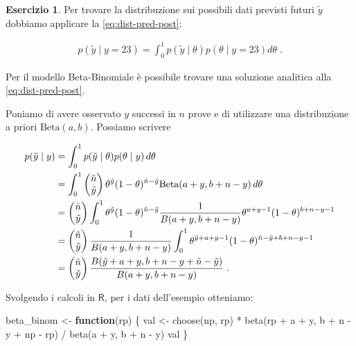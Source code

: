 \documentclass[
  11pt,
]{krantz}
\makeatletter
\newenvironment{Shaded}{\begin{snugshade}}{\end{snugshade}}
\newcommand{\ControlFlowTok}[1]{\textcolor[rgb]{0.27,0.27,0.27}{\textbf{#1}}}
\newcommand{\FunctionTok}[1]{\textcolor[rgb]{0,0,0}{#1}}
\newcommand{\NormalTok}[1]{#1}
\newcommand{\OtherTok}[1]{\textcolor[rgb]{0.37,0.37,0.37}{#1}}
\newcommand{\SpecialCharTok}[1]{\textcolor[rgb]{0,0,0}{#1}}
\newenvironment{kframe}{%
\medskip{}
\setlength{\fboxsep}{.8em}
 \def\at@end@of@kframe{}%
 \ifinner\ifhmode%
  \def\at@end@of@kframe{\end{minipage}}%
  \begin{minipage}{\columnwidth}%
 \fi\fi%
 \def\FrameCommand##1{\hskip\@totalleftmargin \hskip-\fboxsep
 \colorbox{shadecolor}{##1}\hskip-\fboxsep
     \hskip-\linewidth \hskip-\@totalleftmargin \hskip\columnwidth}%
 \MakeFramed {\advance\hsize-\width
   \@totalleftmargin\z@ \linewidth\hsize
   \@setminipage}}%
 {\par\unskip\endMakeFramed%
 \at@end@of@kframe}
\renewenvironment{Shaded}{\begin{kframe}}{\end{kframe}}
\newcommand{\R}{\textsf{R}} %
\theoremstyle{definition}
\theoremstyle{definition}
\theoremstyle{definition}
\newtheorem{exercise}{Esercizio}[chapter]
\theoremstyle{definition}
\theoremstyle{remark}
\makeatother
\begin{document}
\begin{exercise}
Per trovare la distribuzione sui possibili dati previsti futuri \(\tilde{y}\) dobbiamo applicare la \eqref{eq:dist-pred-post}:

\begin{align}
p(\tilde{y} \mid y = 23) = \int_0^1 p(\tilde{y} \mid \theta) p(\theta \mid y = 23) d\theta \; .
\label{eq:post-yprime-y17}
\end{align}

Per il modello Beta-Binomiale è possibile trovare una soluzione analitica alla \eqref{eq:dist-pred-post}.

Poniamo di avere osservato \(y\) successi in \(n\) prove e di utilizzare una distribuzione a priori \(\mbox{Beta}(a, b)\). Possiamo scrivere

\begin{align}
p(\tilde{y} \mid y) &= \int_0^1 p(\tilde{y} \mid \theta)
p(\theta \mid y)\, d\theta \notag\\
 &= \int_0^1 \begin{pmatrix}\tilde{n}\\\tilde{y}\end{pmatrix}
 \theta^{\tilde{y}}
(1-\theta)^{\tilde{n}-\tilde{y}} \mbox{Beta}(a+y,b+n-y) \, d\theta \notag\\
&= \begin{pmatrix}{\tilde{n}}\\\tilde{y}\end{pmatrix} \int_0^1 \theta^{\tilde{y}}
(1-\theta)^{\tilde{n}-\tilde{y}} \frac{1}{B(a+y, b+n-y)}\theta^{a+y-1}(1-\theta)^{b+n-y-1}\notag\\
&= \begin{pmatrix}{\tilde{n}}\\\tilde{y}\end{pmatrix} \frac{1}{B(a+y, b+n-y)}\int_0^1 \theta^{\tilde{y}+a+y-1}(1-\theta)^{\tilde{n}-\tilde{y}+b+n-y-1}\notag\\
&= \begin{pmatrix}{\tilde{n}}\\\tilde{y}\end{pmatrix} \frac{B(\tilde{y}+a+y,b+n-y+\tilde{n}-\tilde{y})}{B(a+y, b+n-y)} \; .
\label{eq:post-yprime-an-sol-betabin}
\end{align}

Svolgendo i calcoli in \(\R\), per i dati dell'esempio otteniamo:

\begin{Shaded}
\begin{Highlighting}[]
\NormalTok{beta\_binom }\OtherTok{\textless{}{-}} \ControlFlowTok{function}\NormalTok{(rp) \{}
\NormalTok{  val }\OtherTok{\textless{}{-}} \FunctionTok{choose}\NormalTok{(np, rp) }\SpecialCharTok{*}
    \FunctionTok{beta}\NormalTok{(rp }\SpecialCharTok{+}\NormalTok{ a }\SpecialCharTok{+}\NormalTok{ y, b }\SpecialCharTok{+}\NormalTok{ n }\SpecialCharTok{{-}}\NormalTok{ y }\SpecialCharTok{+}\NormalTok{ np }\SpecialCharTok{{-}}\NormalTok{ rp) }\SpecialCharTok{/}
    \FunctionTok{beta}\NormalTok{(a }\SpecialCharTok{+}\NormalTok{ y, b }\SpecialCharTok{+}\NormalTok{ n }\SpecialCharTok{{-}}\NormalTok{ y)}
\NormalTok{  val}
\NormalTok{\}}


\end{Highlighting}
\end{Shaded}
\end{exercise}
\end{document}
